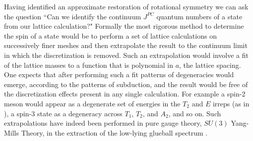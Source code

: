 Having identified an approximate restoration of rotational symmetry we can ask the question ``Can we identify the continuum $J^{PC}$ quantum numbers of a state from our lattice calculation?" Formally the most rigorous method to determine the spin of a state would be to perform a set of lattice calculations on successively finer meshes and then extrapolate the result to the continuum limit in which the discretization is removed. Such an extrapolation would involve a fit of the lattice masses to a function that is polynomial in $a$, the lattice spacing. One expects that after performing such a fit patterns of degeneracies would emerge, according to the patterns of subduction, and the result would be free of the discretization effects present in any single calculation. For example a spin-2 meson would appear as a degenerate set of energies in the $T_2$ and $E$ irreps (as in ), a spin-3 state as a degeneracy across $T_1$, $T_2$, and $A_2$, and so on. Such extrapolations have indeed been performed in pure gauge theory, $SU(3)$ Yang-Mills Theory, in the extraction of the low-lying glueball spectrum  \cite{Morningstar:1999rf}. 


